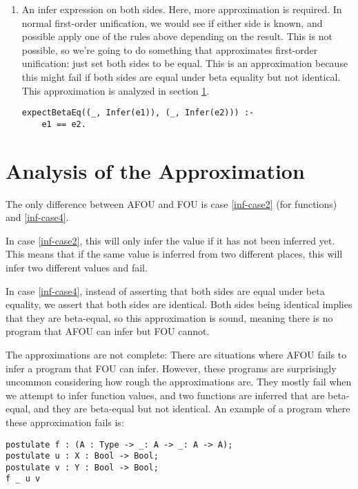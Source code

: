 \begin{enumerate}
	\item \label{inf-case4} An infer expression on both sides. Here, more approximation is required. In normal first-order unification, we would see if either side is known, and possible apply one of the rules above depending on the result. This is not possible, so we're going to do something that approximates first-order unification: just set both sides to be equal. This is an approximation because this might fail if both sides are equal under beta equality but not identical. This approximation is analyzed in section \ref{analysing-inference}.
\begin{lstlisting}
expectBetaEq((_, Infer(e1)), (_, Infer(e2))) :-
	e1 == e2.
\end{lstlisting}
	
\end{enumerate}

\section{Analysis of the Approximation}
\label{analysing-inference}

The only difference between AFOU and FOU is case \ref{inf-case2} (for functions) and \ref{inf-case4}. 

In case \ref{inf-case2}, this will only infer the value if it has not been inferred yet. This means that if the same value is inferred from two different places, this will infer two different values and fail.

In case \ref{inf-case4}, instead of asserting that both sides are equal under beta equality, we assert that both sides are identical. Both sides being identical implies that they are beta-equal, so this approximation is sound, meaning there is no program that AFOU can infer but FOU cannot. 

The approximations are not complete: There are situations where AFOU fails to infer a program that FOU can infer. However, these programs are surprisingly uncommon considering how rough the approximations are. They mostly fail when we attempt to infer function values, and two functions are inferred that are beta-equal, and they are beta-equal but not identical. An example of a program where these approximation fails is:

\begin{lstlisting}
postulate f : (A : Type -> _: A -> _: A -> A);
postulate u : X : Bool -> Bool;
postulate v : Y : Bool -> Bool;
f _ u v
\end{lstlisting}



